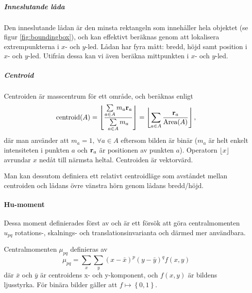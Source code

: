 \documentclass[../rapport_MVEX01-11-05]{subfiles}
\begin{document}
\subparagraph{Inneslutande låda}

Den inneslutande lådan är den minsta rektangeln som innehåller hela
objektet (se figur \ref{fig:boundingbox}),
och kan effektivt beräknas genom att lokalisera
extrempunkterna i $x$- och $y$-led. Lådan har fyra mått: bredd, höjd samt
position i $x$- och $y$-led. Utifrån dessa kan vi även beräkna
mittpunkten i $x$- och $y$-led.

\subparagraph{Centroid}

Centroiden är masscentrum för ett område, och beräknas enligt
\begin{equation*}
  \textrm{centroid}(A) = \left\lfloor\frac{
    \sum\limits_{a\in A}m_a\mathbf{r}_a
  }{
    \sum\limits_{a\in A}m_a
  }\right\rfloor =
  \left\lfloor\sum\limits_{a\in
  A}\frac{\mathbf{r}_a}{\textrm{Area}(A)}\right\rfloor,
\end{equation*}
där man använder att $m_a=1,\:\forall a\in A$ eftersom bilden är
binär ($m_a$ är helt enkelt intensiteten i punkten $a$ och
$\mathbf{r}_a$ är positionen av punkten $a$). Operatorn $\lfloor
x\rfloor$ avrundar $x$ nedåt till närmsta heltal. Centroiden är vektorvärd.

Man kan dessutom definiera ett relativt centroidläge  som avståndet mellan centroiden
och lådans övre vänstra hörn genom lådans bredd/höjd.

\paragraph{Hu-moment}

Dessa moment definierades först av  och är ett försök att
göra centralmomenten $u_{pq}$ rotations-, skalnings- och translationsinvarianta och
därmed mer användbara. 

Centralmomenten $\mu_{pq}$ definieras av
\begin{equation*}
	\mu_{pq} = \sum\limits_x\sum\limits_y
	           \left(x-\bar{x}\right)^p
	           \left(y-\bar{y}\right)^q
	           f(x,y)
\end{equation*}
där $\bar{x}$ och $\bar{y}$ är centroidens x- och y-komponent, och $f(x,y)$ är
bildens ljusstyrka. För binära bilder gäller att
$f\mapsto\left\{0,1\right\}$.
\end{document}

